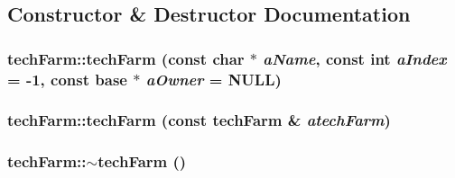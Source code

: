 \subsection{Constructor \& Destructor Documentation}
\hypertarget{classtech_farm_ae7e2f213d28d34dd5c79a8af8f17bb7c}{
\subsubsection[{techFarm}]{\setlength{\rightskip}{0pt plus 5cm}techFarm::techFarm (const char $\ast$ {\em aName}, \/  const int {\em aIndex} = {\ttfamily -\/1}, \/  const {\bf base} $\ast$ {\em aOwner} = {\ttfamily NULL})}}
\label{classtech_farm_ae7e2f213d28d34dd5c79a8af8f17bb7c}
\hypertarget{classtech_farm_a9deb240c762e0410ccdf1027670bc093}{
\subsubsection[{techFarm}]{\setlength{\rightskip}{0pt plus 5cm}techFarm::techFarm (const {\bf techFarm} \& {\em atechFarm})}}
\label{classtech_farm_a9deb240c762e0410ccdf1027670bc093}
\hypertarget{classtech_farm_acb6fb1867d18de12e43b7b28fe249240}{
\subsubsection[{$\sim$techFarm}]{\setlength{\rightskip}{0pt plus 5cm}techFarm::$\sim$techFarm ()}}
\label{classtech_farm_acb6fb1867d18de12e43b7b28fe249240}


